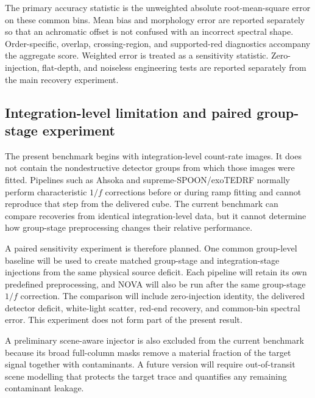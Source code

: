 The primary accuracy statistic is the unweighted absolute root-mean-square
error on these common bins. Mean bias and morphology error are reported
separately so that an achromatic offset is not confused with an incorrect
spectral shape. Order-specific, overlap, crossing-region, and supported-red
diagnostics accompany the aggregate score. Weighted error is treated as a
sensitivity statistic. Zero-injection, flat-depth, and noiseless engineering
tests are reported separately from the main recovery experiment.

\subsection{Integration-level limitation and paired group-stage experiment}

The present benchmark begins with integration-level count-rate images. It does
not contain the nondestructive detector groups from which those images were
fitted. Pipelines such as Ahsoka and supreme-SPOON/exoTEDRF normally perform
characteristic $1/f$ corrections before or during ramp fitting and cannot
reproduce that step from the delivered cube. The current benchmark can compare
recoveries from identical integration-level data, but it cannot determine how
group-stage preprocessing changes their relative performance.

A paired sensitivity experiment is therefore planned. One common group-level
baseline will be used to create matched group-stage and integration-stage
injections from the same physical source deficit. Each pipeline will retain
its own predefined preprocessing, and NOVA will also be run after the same
group-stage $1/f$ correction. The comparison will include zero-injection
identity, the delivered detector deficit, white-light scatter, red-end
recovery, and common-bin spectral error. This experiment does not form part of
the present result.

A preliminary scene-aware injector is also excluded from the current
benchmark because its broad full-column masks remove a material fraction of
the target signal together with contaminants. A future version will require
out-of-transit scene modelling that protects the target trace and quantifies
any remaining contaminant leakage.

